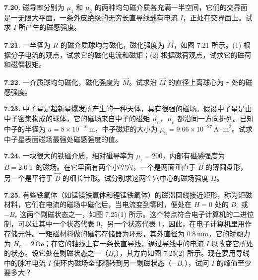 \vfill
\newpage

\textbf{7.20.} 磁导率分别为 $\mu_1$ 和 $\mu_2$ 的两种均匀磁介质各充满一半空间，它们的交界面是一无限大平面，一条外皮绝缘的无穷长直导线载有电流 $I$，正处在交界面上。试求 $I$ 所产生的磁感强度。

\vfill
\newpage

\textbf{7.21.} 一半径为 $R$ 的磁介质球均匀磁化，磁化强度为 $\vec{M}$，如图 7.21 所示。(1) 根据分子电流的观点，试求它的磁化电流和磁矩；(2) 根据磁荷观点，试求它的磁荷和磁偶极矩。

\begin{center}
\end{center}

\vfill
\newpage

\textbf{7.22.} 一介质球均匀磁化，磁化强度为 $\vec{M}$。试求沿 $\vec{M}$ 的直径上离球心为 $r$ 处的磁感强度。

\vfill
\newpage

\textbf{7.23.} 中子星是超新星爆发所产生的一种天体，具有很强的磁场。假设中子星是由中子密集构成的球体，它的磁场来自中子的磁矩 $\vec{\mu}_{\mathrm{n}}$，$\vec{\mu}_{\mathrm{n}}$ 都沿同一方向排列。已知中子的半径为 $a = 8 \times 10^{-16}\,\mathrm{m}$，中子磁矩的大小为 $\mu_{\mathrm{n}} = 9.66 \times 10^{-27}\,\mathrm{A\cdot m}^{2}$。试求中子星表面磁场最强处磁感强度的值。

\vfill
\newpage

\textbf{7.24.} 一块很大的铁磁介质，相对磁导率为 $\mu_{\mathrm{r}} = 200$，内部有磁感强度为 $B = 2.0\,\mathrm{T}$ 的磁场。在它里面有两个小空穴，一个是两面垂直于 $\vec{B}$ 的薄圆盘形，另一个是平行于 $\vec{B}$ 的细长针形。试分别求这两空穴中心的磁场强度 $H$。

\vfill
\newpage

\textbf{7.25.} 有些铁氧体（如锰镁铁氧体和锂锰铁氧体）的磁滞回线接近矩形，称为矩磁材料，它们在电流的磁场中磁化后，当电流变到零时，便处在 $H = 0$ 处的 $B_r$ 或 $-B_r$ 这两个剩磁状态之一，如图 7.25(1) 所示。这个特点符合电子计算机的二进位制，可以让其中一个状态代表 0，另一个状态代表 1，因此，在电子计算机里用作存储元件。一矩磁材料做的磁芯存储器为环形，其外直径为 $0.8\,\mathrm{mm}$，它的矫顽力为 $H_c = 2\,\mathrm{Oe}$；在它的轴线上有一条长直导线，通过导线中的电流 $I$ 以改变它所处的状态。设它处在剩磁状态之一（$B_r$），其方向如图 7.25(2) 所示。现在要用导线中的脉冲电流 $I$ 使环内磁场全部翻转到另一剩磁状态（$-B_r$），试问 $I$ 的峰值至少要多大？

\begin{center}
  \begin{minipage}[b]{0.47\linewidth}
    \centering
  \end{minipage}\hfill
  \begin{minipage}[b]{0.47\linewidth}
    \centering
  \end{minipage}
\end{center}

